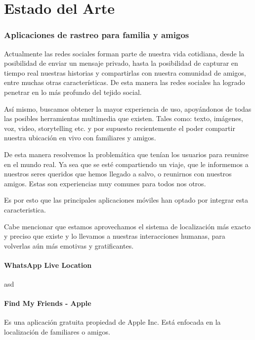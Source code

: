 \chapter{Estado del Arte}

\subsection{Aplicaciones de rastreo para familia y amigos}

Actualmente las redes sociales forman parte de nuestra vida cotidiana, desde la posibilidad de enviar un mensaje privado, hasta la posibilidad de capturar en tiempo real nuestras historias y compartirlas con nuestra comunidad de amigos, entre muchas otras características. De esta manera las redes sociales ha logrado penetrar en lo más profundo del tejido social.

Así mismo, buscamos obtener la mayor experiencia de uso, apoyándonos de todas las posibles herramientas multimedia que existen. Tales como: texto, imágenes, voz, video, storytelling etc. y por supuesto recientemente el poder compartir nuestra ubicación en vivo con familiares y amigos.

De esta manera resolvemos la problemática que tenían los usuarios para reunirse en el mundo real. Ya sea que se esté compartiendo un viaje, que le informemos a nuestros seres queridos que hemos llegado a salvo, o reunirnos con nuestros amigos. Estas son experiencias muy comunes para todos nos otros. \cite{zafirKhan}

Es por  esto que las principales aplicaciones móviles han optado por  integrar esta caracteristica. 

Cabe mencionar que estamos aprovechamos el sistema de localización más exacto y preciso que existe y lo llevamos a nuestras interacciones humanas, para volverlas aún más emotivas y gratificantes.

\subsubsection{WhatsApp Live Location}

asd

\subsubsection{Find My Friends - Apple}

Es una aplicación gratuita propiedad de Apple Inc. Está enfocada en la localización de familiares o amigos.


